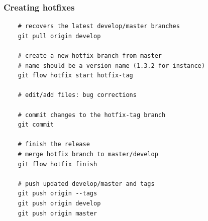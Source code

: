 \documentclass[svgnames]{beamer}
\begin{document}
\begin{frame}[fragile]
    \frametitle{Creating hotfixes}
    \begin{lstlisting}
    # recovers the latest develop/master branches
    git pull origin develop

    # create a new hotfix branch from master
    # name should be a version name (1.3.2 for instance)
    git flow hotfix start hotfix-tag

    # edit/add files: bug corrections

    # commit changes to the hotfix-tag branch
    git commit 

    # finish the release
    # merge hotfix branch to master/develop
    git flow hotfix finish

    # push updated develop/master and tags
    git push origin --tags
    git push origin develop
    git push origin master
    \end{lstlisting}
\end{frame}
\end{document}

